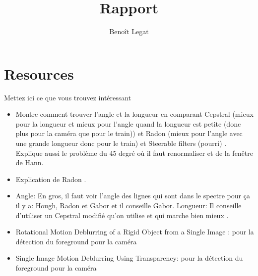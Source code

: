 \documentclass{report}
\title{Rapport}
\author{Benoît Legat}
\begin{document}


\section{Resources}
Mettez ici ce que vous trouvez intéressant
\begin{itemize}
  \item Montre comment trouver l'angle et la longueur en comparant Cepstral (mieux pour la longueur et mieux pour l'angle quand la longueur est petite (donc plus pour la caméra que pour le train)) et Radon (mieux pour l'angle avec une grande longueur donc pour le train) et Steerable filters (pourri) \cite{krahmer2006blind}.
    Explique aussi le problème du 45 degré où il faut renormaliser et de la fenêtre de Hann.
  \item Explication de Radon \cite{oliveira2007blind}.
  \item Angle: En gros, il faut voir l'angle des lignes qui sont dans le spectre pour ça il y a: Hough, Radon et Gabor et il conseille Gabor.
    Longueur: Il conseille d'utiliser un Cepstral modifié qu'on utilise et qui marche bien mieux \cite{Deshpande2014606}.
   \item  Rotational Motion Deblurring of a Rigid Object from a Single Image : pour la détection du foreground pour la caméra
   \item  Single Image Motion Deblurring Using Transparency: pour la détection du foreground pour la caméra
\end{itemize}
\end{document}

